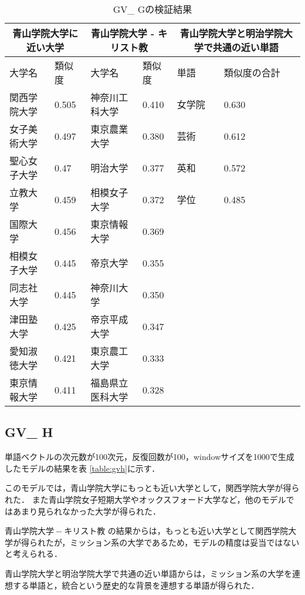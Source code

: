 \begin{table}[H]
\caption{GV\_ Gの検証結果}
\centering
\footnotesize
\begin{tabular}{ll|ll|ll}
\hline
\multicolumn{2}{c}{青山学院大学に近い大学} & \multicolumn{2}{c}{青山学院大学 - キリスト教} & \multicolumn{2}{c}{青山学院大学と明治学院大学で共通の近い単語}
\\ \hline
大学名 & 類似度 & 大学名 & 類似度 & 単語 & 類似度の合計
\\ \hline \hline
関西学院大学 & 0.505 & 神奈川工科大学 & 0.410 & 女学院 & 0.630\\
女子美術大学 & 0.497 & 東京農業大学 & 0.380 & 芸術 & 0.612\\
聖心女子大学 & 0.47 & 明治大学 & 0.377 & 英和 & 0.572\\
立教大学 & 0.459 & 相模女子大学 & 0.372 & 学位 & 0.485\\
国際大学 & 0.456 & 東京情報大学 & 0.369 & & \\
相模女子大学 & 0.445 & 帝京大学 & 0.355 & & \\
同志社大学 & 0.445 & 神奈川大学 & 0.350 & & \\
津田塾大学 & 0.425 & 帝京平成大学 & 0.347 & & \\
愛知淑徳大学 & 0.421 & 東京農工大学 & 0.333 & & \\
東京情報大学 & 0.411 & 福島県立医科大学 & 0.328 & & \\ \hline
\end{tabular}
\label{table:gvg}
\end{table}

\subsection{GV\_ H}
単語ベクトルの次元数が100次元，反復回数が100，windowサイズを1000で生成したモデルの結果を表 \ref{table:gvh}に示す．

このモデルでは，青山学院大学にもっとも近い大学として，関西学院大学が得られた．
また青山学院女子短期大学やオックスフォード大学など，他のモデルではあまり見られなかった大学が得られた．

$ 青山学院大学 - キリスト教 $ の結果からは，もっとも近い大学として関西学院大学が得られたが，ミッション系の大学であるため，モデルの精度は妥当ではないと考えられる．

青山学院大学と明治学院大学で共通の近い単語からは，ミッション系の大学を連想する単語と，統合という歴史的な背景を連想する単語が得られた．


